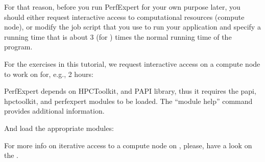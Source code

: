 For that reason, before you run PerfExpert for your own purpose later, you should either request interactive access to computational resources (compute node), or modify the job script that you use to run your application and specify a running time that is about
3 (for \hpcname)
times the normal running time of the program.

For the exercises in this tutorial, we request interactive access on a compute node to work on for, e.g., 2 hours:

\begin{prompt}
\end{prompt}

PerfExpert depends on HPCToolkit, and PAPI library, thus it requires the papi, hpctoolkit, and perfexpert modules to be loaded. The ``module help'' command provides additional information.

And load the appropriate modules:

\begin{prompt}
\end{prompt}

\ifbrussel
\begin{prompt}
\end{prompt}
\fi

For more info on iterative access to a compute node on \hpcname, please, have a look on the \hpcuserguide.
